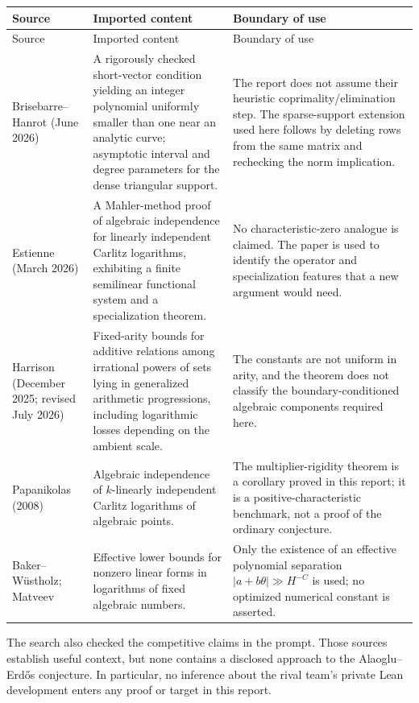 \documentclass[11pt,oneside]{article}
\theoremstyle{definition}
\theoremstyle{remark}
\newcommand{\AEconj}{Alaoglu--Erd\H{o}s}
\newcommand{\tht}{\theta}
\begin{document}
\begin{longtable}{L{0.21\textwidth}L{0.34\textwidth}L{0.36\textwidth}}
\toprule
Source & Imported content & Boundary of use \\
\midrule
\endfirsthead
\toprule
Source & Imported content & Boundary of use \\
\midrule
\endhead
Brisebarre--Hanrot (June 2026) & A rigorously checked short-vector condition yielding an integer
polynomial uniformly smaller than one near an analytic curve; asymptotic interval and degree
parameters for the dense triangular support. & The report does not assume their heuristic
coprimality/elimination step.  The sparse-support extension used here follows by deleting rows from
the same matrix and rechecking the norm implication. \\
Estienne (March 2026) & A Mahler-method proof of algebraic independence for linearly independent
Carlitz logarithms, exhibiting a finite semilinear functional system and a specialization theorem.
& No characteristic-zero analogue is claimed.  The paper is used to identify the operator and
specialization features that a new argument would need. \\
Harrison (December 2025; revised July 2026) & Fixed-arity bounds for additive relations among
irrational powers of sets lying in generalized arithmetic progressions, including logarithmic
losses depending on the ambient scale. & The constants are not uniform in arity, and the theorem
does not classify the boundary-conditioned algebraic components required here. \\
Papanikolas (2008) & Algebraic independence of $k$-linearly independent Carlitz logarithms of
algebraic points. & The multiplier-rigidity theorem is a corollary proved in this report; it is a
positive-characteristic benchmark, not a proof of the ordinary conjecture. \\
Baker--W\"ustholz; Matveev & Effective lower bounds for nonzero linear forms in logarithms of fixed
algebraic numbers. & Only the existence of an effective polynomial separation
$|a+b\tht|\gg H^{-C}$ is used; no optimized numerical constant is asserted. \\
\bottomrule
\end{longtable}

The search also checked the competitive claims in the prompt.  Those sources establish useful
context, but none contains a disclosed approach to the \AEconj{} conjecture.  In particular, no
inference about the rival team's private Lean development enters any proof or target in this
report.
\end{document}
